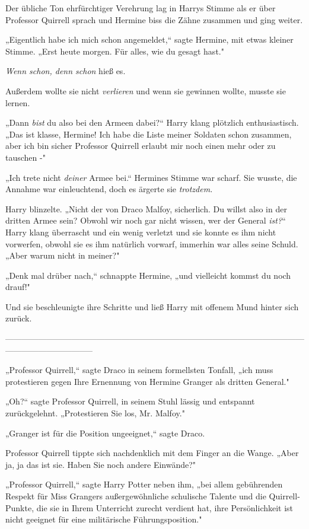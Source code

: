 {Der übliche Ton ehrfürchtiger Verehrung lag in Harrys Stimme als er über Professor Quirrell sprach und Hermine biss die Zähne zusammen und ging weiter.

„Eigentlich habe ich mich schon angemeldet,“ sagte Hermine, mit etwas kleiner Stimme. „Erst heute morgen. Für alles, wie du gesagt hast."

\emph{Wenn schon, denn schon} hieß es.

Außerdem wollte sie nicht \emph{verlieren} und wenn sie gewinnen wollte, musste sie lernen.

„Dann \emph{bist} du also bei den Armeen dabei?“ Harry klang plötzlich enthusiastisch. „Das ist klasse, Hermine! Ich habe die Liste meiner Soldaten schon zusammen, aber ich bin sicher Professor Quirrell erlaubt mir noch einen mehr oder zu tauschen -"

„Ich trete nicht \emph{deiner} Armee bei.“ Hermines Stimme war scharf. Sie wusste, die Annahme war einleuchtend, doch es ärgerte sie \emph{trotzdem.}

Harry blinzelte. „Nicht der von Draco Malfoy, sicherlich. Du willst also in der dritten Armee sein? Obwohl wir noch gar nicht wissen, wer der General \emph{ist?}“ Harry klang überrascht und ein wenig verletzt und sie konnte es ihm nicht vorwerfen, obwohl sie es ihm natürlich vorwarf, immerhin war alles seine Schuld. „Aber warum nicht in meiner?"

„Denk mal drüber nach,“ schnappte Hermine, „und vielleicht kommst du noch drauf!"

Und sie beschleunigte ihre Schritte und ließ Harry mit offenem Mund hinter sich zurück.

--------------------------------------------------------------------------------------------------------------------------------------------

\hfill\break „Professor Quirrell,“ sagte Draco in seinem formellsten Tonfall, „ich muss protestieren gegen Ihre Ernennung von Hermine Granger als dritten General."

„Oh?“ sagte Professor Quirrell, in seinem Stuhl lässig und entspannt zurückgelehnt. „Protestieren Sie los, Mr. Malfoy."

„Granger ist für die Position ungeeignet,“ sagte Draco.

Professor Quirrell tippte sich nachdenklich mit dem Finger an die Wange. „Aber ja, ja das ist sie. Haben Sie noch andere Einwände?"

„Professor Quirrell,“ sagte Harry Potter neben ihm, „bei allem gebührenden Respekt für Miss Grangers außergewöhnliche schulische Talente und die Quirrell-Punkte, die sie in Ihrem Unterricht zurecht verdient hat, ihre Persönlichkeit ist nicht geeignet für eine militärische Führungsposition."

}
